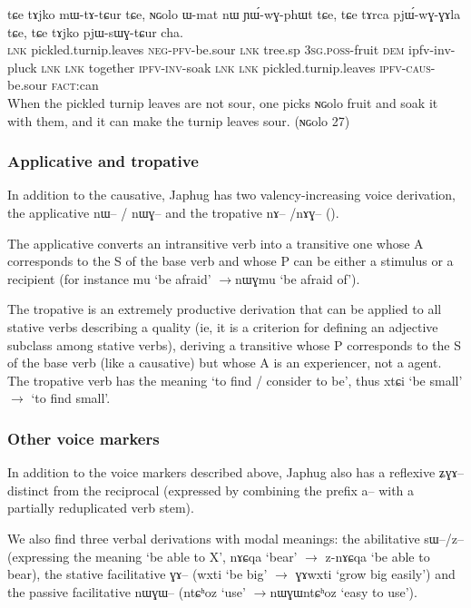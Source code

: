\documentclass[oldfontcommands,oneside,a4paper,11pt]{article}
\newcommand{\ipa}[1]{{\phon #1}} %
\begin{document}
 \begin{exe}
\ex \label{ex:ngolo-tAjko}
\gll
\ipa{tɕe} 	\ipa{tɤjko} 	\ipa{mɯ-tɤ-tɕur} 	\ipa{tɕe,} 	\ipa{ɴɢolo} 	\ipa{ɯ-mat} 	\ipa{nɯ} 	\ipa{ɲɯ́-wɣ-phɯt} 	\ipa{tɕe,} 	\ipa{tɕe} 	\ipa{tɤrca} 	\ipa{pjɯ́-wɣ-ɣɤla} 	\ipa{tɕe,} 	\ipa{tɕe} 	\ipa{tɤjko} 	\ipa{pjɯ-sɯɣ-tɕur} 	\ipa{cha.} \\ 
\textsc{lnk} pickled.turnip.leaves \textsc{neg-pfv}-be.sour \textsc{lnk} tree.sp \textsc{3sg.poss}-fruit \textsc{dem} ipfv-inv-pluck \textsc{lnk} \textsc{lnk} together \textsc{ipfv-inv}-soak \textsc{lnk} \textsc{lnk}  pickled.turnip.leaves \textsc{ipfv-caus}-be.sour \textsc{fact}:can \\
 \glt When the pickled turnip leaves are not sour, one picks \ipa{ɴɢolo} fruit and soak it with them, and it can make the turnip leaves sour.   (\ipa{ɴɢolo} 27)
   \end{exe}

\subsubsection{Applicative and tropative}
In addition to the causative, Japhug has two valency-increasing voice derivation, the applicative \ipa{nɯ--} / \ipa{nɯɣ--} and the tropative \ipa{nɤ--} /\ipa{nɤɣ--} (\citealt{jacques13tropative}).

The applicative converts an intransitive verb into a transitive one whose A corresponds to the S of the base verb and whose P can be either a stimulus or a recipient (for instance \ipa{mu} `be afraid' $\rightarrow$\ipa{nɯɣmu} `be afraid of'). 

The tropative is an extremely productive derivation that can be applied to all stative verbs describing a quality (ie, it is a criterion for defining an adjective subclass among stative verbs), deriving a transitive whose P corresponds to the S of the base verb (like a causative) but whose A is an experiencer, not a agent. The tropative verb has the meaning `to find / consider to be', thus \ipa{xtɕi} `be small' $\rightarrow$ `to find small'.

\subsubsection{Other voice markers}
In addition to the voice markers described above, Japhug also has a reflexive \ipa{ʑɣɤ--} distinct from the reciprocal (expressed by combining the prefix \ipa{a--} with a partially reduplicated verb stem).

We also find three verbal derivations with modal meanings: the abilitative \ipa{sɯ--/z--} (expressing the meaning `be able to X', \ipa{nɤɕqa} `bear' $\rightarrow$ \ipa{z-nɤɕqa} `be able to bear), the stative facilitative \ipa{ɣɤ--} (\ipa{wxti} `be big' $\rightarrow$ \ipa{ɣɤwxti} `grow big easily') and the passive facilitative \ipa{nɯɣɯ--} (\ipa{ntɕʰoz} `use' $\rightarrow$\ipa{nɯɣɯntɕʰoz} `easy to use').
   
\end{document}
